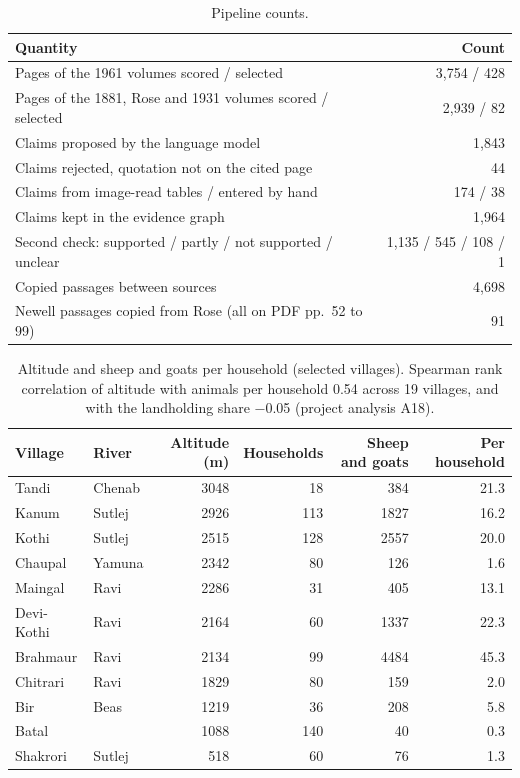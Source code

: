 \documentclass[11pt,a4paper]{article}
\begin{document}
\begin{table}[h]\centering\small
\caption{Pipeline counts.}\label{tab:pipe}
\begin{tabular}{lr}\toprule
Quantity & Count\\\midrule
Pages of the 1961 volumes scored / selected & 3,754 / 428\\
Pages of the 1881, Rose and 1931 volumes scored / selected & 2,939 / 82\\
Claims proposed by the language model & 1,843\\
Claims rejected, quotation not on the cited page & 44\\
Claims from image-read tables / entered by hand & 174 / 38\\
Claims kept in the evidence graph & 1,964\\
Second check: supported / partly / not supported / unclear & 1,135 / 545 / 108 / 1\\
Copied passages between sources & 4,698\\
Newell passages copied from Rose (all on PDF pp.~52 to 99) & 91\\
\bottomrule\end{tabular}
\end{table}

\begin{table}[h]\centering\small
\caption{Altitude and sheep and goats per household (selected villages). Spearman rank correlation of altitude with animals per household 0.54 across 19 villages, and with the landholding share −0.05 (project analysis A18).}\label{tab:alt}
\begin{tabular}{llrrrr}\toprule
Village & River & Altitude (m) & Households & Sheep and goats & Per household\\\midrule
Tandi & Chenab & 3048 & 18 & 384 & 21.3\\
Kanum & Sutlej & 2926 & 113 & 1827 & 16.2\\
Kothi & Sutlej & 2515 & 128 & 2557 & 20.0\\
Chaupal & Yamuna & 2342 & 80 & 126 & 1.6\\
Maingal & Ravi & 2286 & 31 & 405 & 13.1\\
Devi-Kothi & Ravi & 2164 & 60 & 1337 & 22.3\\
Brahmaur & Ravi & 2134 & 99 & 4484 & 45.3\\
Chitrari & Ravi & 1829 & 80 & 159 & 2.0\\
Bir & Beas & 1219 & 36 & 208 & 5.8\\
Batal & & 1088 & 140 & 40 & 0.3\\
Shakrori & Sutlej & 518 & 60 & 76 & 1.3\\
\bottomrule\end{tabular}
\end{table}
\end{document}
